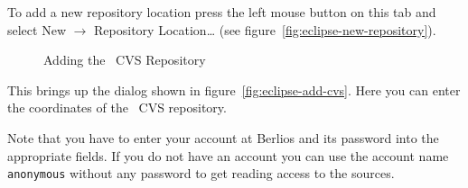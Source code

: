 \documentclass{extex-doc}
\newcommand\menu{\textsf}
\newcommand\sub{\(\rightarrow\) }
\begin{document}
To add a new repository location press the left mouse button on this
tab and select \menu{New \sub Repository Location\ldots} (see
figure~\ref{fig:eclipse-new-repository}).
\begin{figure}[ht]
  \hbox{}\hfill
  \hfill
  \caption{Adding the \ExTeX\ CVS Repository}
\end{figure}

This brings up the dialog shown in figure~\ref{fig:eclipse-add-cvs}.
Here you can enter the coordinates of the \ExTeX\ CVS repository.

Note that you have to enter your account at Berlios and its password
into the appropriate fields. If you do not have an account you can use
the account name \texttt{anonymous} without any password to get
reading access to the sources.
\end{document}
